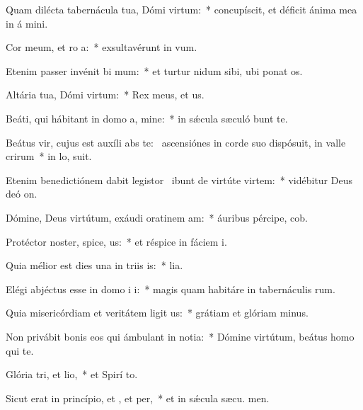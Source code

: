 \item Quam dilécta tabernácula tua, Dómi virtum:~* concupíscit, et déficit ánima mea in á mini.
\item Cor meum, et ro a:~* exsultavérunt in  vum.
\item Etenim passer invénit bi mum:~* et turtur nidum sibi, ubi ponat  os.
\item Altária tua, Dómi virtum:~* Rex meus, et  us.
\item Beáti, qui hábitant in domo a, mine:~* in sǽcula sæculó bunt te.
\item Beátus vir, cujus est auxíli abs te:~\pscross{} ascensiónes in corde suo dispósuit, in valle crirum~* in lo,  suit.
\item Etenim benedictiónem dabit legistor~\pscross{} ibunt de virtúte  virtem:~* vidébitur Deus deó  on.
\item Dómine, Deus virtútum, exáudi oratinem am:~* áuribus pércipe,  cob.
\item Protéctor noster, spice, us:~* et réspice in fáciem  i.
\item Quia mélior est dies una in triis is:~*  lia.
\item Elégi abjéctus esse in domo i i:~* magis quam habitáre in tabernáculis rum.
\item Quia misericórdiam et veritátem ligit us:~* grátiam et glóriam  minus.
\item Non privábit bonis eos qui ámbulant in notia:~* Dómine virtútum, beátus homo qui   te.
\item Glória tri, et lio,~* et Spirí to.
\item Sicut erat in princípio, et , et per,~* et in sǽcula sæcu. men.

